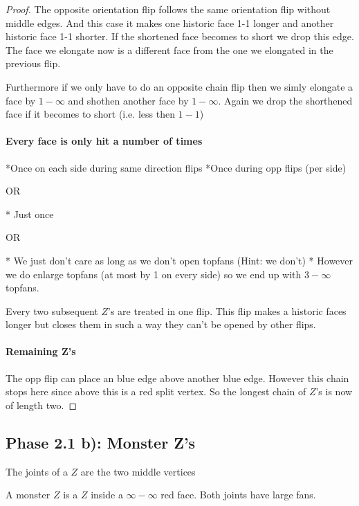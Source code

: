 \begin{proof}
  The opposite orientation flip follows the same orientation flip without middle edges. And this case it makes one historic face 1-1 longer and another historic face 1-1 shorter. If the shortened face becomes to short we drop this edge.
  The face we elongate now is a different face from the one we elongated in the previous flip.

  Furthermore if we only have to do an opposite chain flip then we simly elongate a face by $1-\infty$ and shothen another face by $1-\infty$. Again we drop the shorthened face if it becomes to short (i.e. less then $1-1$)

  \paragraph{Every face is only hit a number of times}
  *Once on each side during same direction flips
  *Once during opp flips (per side)

  OR

  * Just once

  OR

  * We just don't care as long as we don't open topfans (Hint: we don't)
  * However we do enlarge topfans (at most by 1 on every side) so we end up with $3-\infty$ topfans.

  Every two subsequent $Z$'s are treated in one flip. This flip makes a historic faces longer but closes them in such a way they can't be opened by other flips.

  \paragraph{Remaining Z's}
  The opp flip can place an blue edge above another blue edge. However this chain stops here since above this is a red split vertex. So the longest chain of $Z$'s is now of length two.




\end{proof}
\subsection{Phase 2.1 b): Monster Z's}

  \begin{defi}[Joints]
    The joints of a $Z$ are the two middle vertices
  \end{defi}
  \begin{defi}[Monster $Z$]
    A monster $Z$ is a $Z$ inside a $\infty-\infty$ red face. Both joints have large fans.
  \end{defi}

